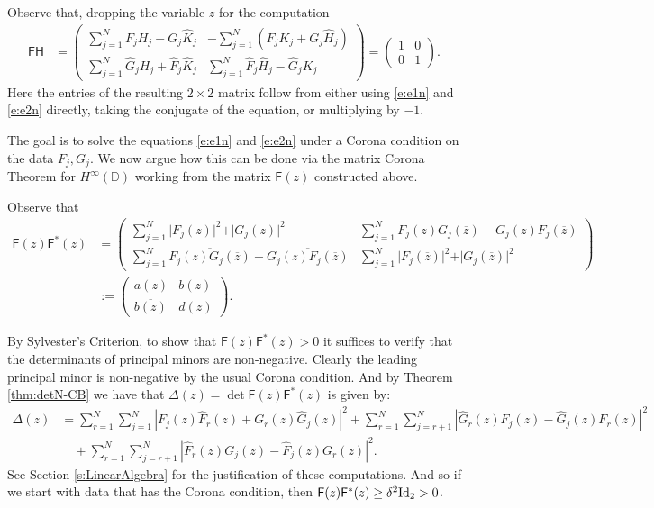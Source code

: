 \documentclass[11pt]{amsart}
\begin{document}
Observe that, dropping the variable $z$ for the computation
\begin{align*}
\mathsf{F}\mathsf{H} & =
\left(
\begin{array}{cc}
  \displaystyle\sum_{j=1}^{N}F_jH_j-G_j\hat{K}_j
& \displaystyle -\sum_{j=1}^{N}(F_jK_j+G_j\hat{H}_j) \\
\displaystyle\sum_{j=1}^{N}\hat{G}_jH_j+\hat{F}_j\hat{K}_j & \displaystyle\sum_{j=1}^{N}\hat{F}_j\hat{H}_j-\hat{G}_jK_j
\end{array}
\right) =\left(
\begin{array}{cc}
  1 & 0\\
  0  & 1
\end{array}
\right).
\end{align*}
Here the entries of the resulting $2\times 2$ matrix follow from either using \eqref{e:e1n} and \eqref{e:e2n} directly, taking the conjugate of the equation, or multiplying by $-1$.

The goal is to solve the equations \eqref{e:e1n} and \eqref{e:e2n} under a Corona condition on the data $F_j, G_j$.  We now argue how this can be done via the matrix Corona Theorem for $H^\infty(\mathbb{D})$ working from the matrix $\mathsf{F}(z)$ constructed above.

Observe that
\begin{align*}
\mathsf{F}(z)\mathsf{F}^{\ast}(z) & =
\left(\begin{array}{cc}
\displaystyle\sum_{j=1}^{N} \vert F_j(z)\vert^2+\vert G_j(z)\vert^2 & \displaystyle\sum_{j=1}^{N}F_j(z)G_j(\overline{z})-G_j(z)F_j(\overline{z})\\
\displaystyle\sum_{j=1}^{N}\overline{F_j(z)G_j(\overline{z})}-\overline{G_j(z)F_j(\overline{z})} & \displaystyle\sum_{j=1}^{N} \vert F_j(\overline{z})\vert^2 +\vert G_j(\overline{z})\vert^2
\end{array}
\right)\\
& :=
\left(\begin{array}{cc}
a(z) & b(z)\\
\overline{b(z)} & d(z)
\end{array}
\right).
\end{align*}

By Sylvester's Criterion, to show that $\mathsf{F}(z)\mathsf{F}^{\ast}(z)> 0$ it suffices to verify that the determinants of principal minors are non-negative.  Clearly the leading principal minor is non-negative by the usual Corona condition.  And by Theorem \ref{thm:detN-CB} we have that $\Delta(z)=\det \mathsf{F}(z)\mathsf{F}^{\ast}(z)$ is given by:
\begin{align*}
\Delta(z) &=\sum_{r=1}^{N}\sum_{j=1}^{N}
\left\vert F_j(z)\hat{F}_r(z)+G_r(z)\hat{G}_j(z)\right\vert^2
+\sum_{r=1}^{N}\sum_{j=r+1}^{N}\left\vert \hat{G}_r(z)F_j(z)-\hat{G}_j(z)F_r(z)\right\vert^2\\
& \quad +\sum_{r=1}^{N}\sum_{j=r+1}^{N}\left\vert \hat{F}_r(z)G_j(z)-\hat{F}_j(z)G_r(z)\right\vert^2.
\end{align*}
See Section \ref{s:LinearAlgebra} for the justification of these computations.  And so if we start with data that has the Corona condition, then $\mathsf{F}(z)\mathsf{F}^*(z)\geq \delta^2\textnormal{Id}_2>0$.
\end{document}
